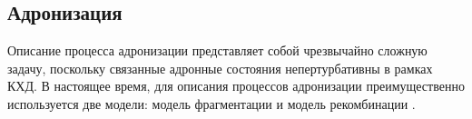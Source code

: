 \subsection{Адронизация} \label{subsec:ch1/sec1_1}
Описание процесса адронизации представляет собой чрезвычайно сложную задачу, поскольку связанные адронные состояния непертурбативны в рамках КХД.
В настоящее время, для описания процессов адронизации преимущественно используется две модели: модель фрагментации \cite{FragmentationLund} и модель рекомбинации \cite{Coalescence_models}. 



